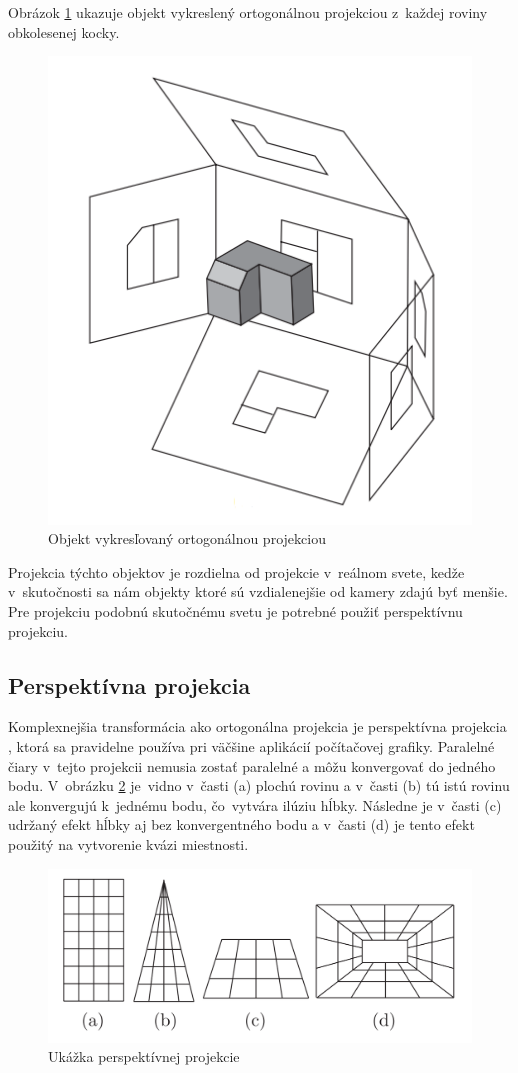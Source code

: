 Obrázok \ref{ortogonal} ukazuje objekt vykreslený ortogonálnou projekciou z~každej roviny obkolesenej kocky.

\begin{figure}[t]
    \centering
    \includegraphics[width=0.4\linewidth]{obrazky-figures/ortogonal.png}
    \caption{Objekt vykresľovaný ortogonálnou projekciou \cite{transf&proj}}
    \label{ortogonal}
\end{figure}

Projekcia týchto objektov \cite{RTRend} je rozdielna od projekcie v~reálnom svete, kedže v~skutočnosti sa nám objekty ktoré sú vzdialenejšie od kamery zdajú byť menšie. Pre projekciu podobnú skutočnému svetu je potrebné použiť perspektívnu projekciu.

 \subsection*{Perspektívna projekcia}

Komplexnejšia transformácia ako ortogonálna projekcia je perspektívna projekcia \cite{RTRend}, ktorá sa pravidelne používa pri väčšine aplikácií počítačovej grafiky. Paralelné čiary v~tejto projekcii nemusia zostať paralelné a môžu konvergovať do jedného bodu. V~obrázku \ref{perspective} je~vidno v~časti (a) plochú rovinu a v~časti (b) tú istú rovinu ale konvergujú k~jednému bodu, čo~vytvára ilúziu hĺbky. Následne je v~časti (c) udržaný efekt hĺbky aj bez konvergentného bodu a v~časti (d) je tento efekt použitý na vytvorenie kvázi miestnosti.

\begin{figure}[b!]
    \centering
    \includegraphics[width=0.7\linewidth]{obrazky-figures/perspective.png}
    \caption{Ukážka perspektívnej projekcie \cite{transf&proj}}
    \label{perspective}
\end{figure}
\newpage

